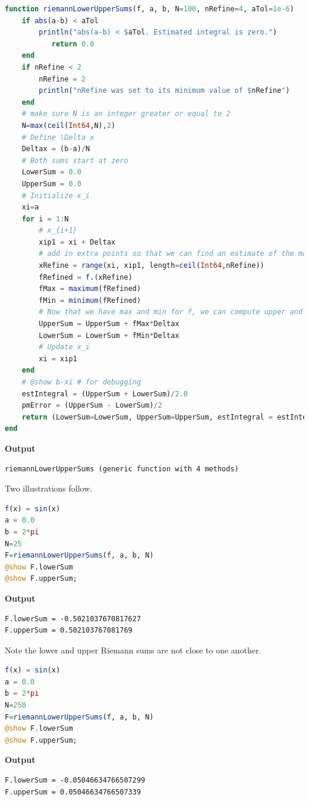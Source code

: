 \bigskip

\begin{lstlisting}[language=Julia,style=mystyle]
function riemannLowerUpperSums(f, a, b, N=100, nRefine=4, aTol=1e-6)
    if abs(a-b) < aTol 
        println("abs(a-b) < $aTol. Estimated integral is zero.")
           return 0.0
    end
    if nRefine < 2
        nRefine = 2
        println("nRefine was set to its minimum value of $nRefine")
    end
    # make sure N is an integer greater or equal to 2
    N=max(ceil(Int64,N),2)
    # Define \Delta x
    Deltax = (b-a)/N
    # Both sums start at zero
    LowerSum = 0.0
    UpperSum = 0.0
    # Initialize x_i
    xi=a 
    for i = 1:N
        # x_{i+1}
        xip1 = xi + Deltax
        # add in extra points so that we can find an estimate of the max and min
        xRefine = range(xi, xip1, length=ceil(Int64,nRefine))
        fRefined = f.(xRefine)
        fMax = maximum(fRefined)
        fMin = minimum(fRefined)
        # Now that we have max and min for f, we can compute upper and lower sums
        UpperSum = UpperSum + fMax*Deltax
        LowerSum = LowerSum + fMin*Deltax
        # Update x_i
        xi = xip1 
    end
    # @show b-xi # for debugging
    estIntegral = (UpperSum + LowerSum)/2.0
    pmError = (UpperSum - LowerSum)/2
    return (LowerSum=LowerSum, UpperSum=UpperSum, estIntegral = estIntegral, pmError = pmError)
end
\end{lstlisting}
\textbf{Output} 
\begin{verbatim}
riemannLowerUpperSums (generic function with 4 methods)
\end{verbatim}

\bigskip
Two illustrations follow.
\bigskip
\begin{lstlisting}[language=Julia,style=mystyle]
f(x) = sin(x)
a = 0.0
b = 2*pi
N=25
F=riemannLowerUpperSums(f, a, b, N)
@show F.lowerSum 
@show F.upperSum; 
\end{lstlisting}
\textbf{Output} 
\begin{verbatim}
F.lowerSum = -0.5021037670817627
F.upperSum = 0.502103767081769
\end{verbatim}

\bigskip
Note the lower and upper Riemann sums are not close to one another.
\bigskip

\begin{lstlisting}[language=Julia,style=mystyle]
f(x) = sin(x)
a = 0.0
b = 2*pi
N=250
F=riemannLowerUpperSums(f, a, b, N)
@show F.lowerSum 
@show F.upperSum; 
\end{lstlisting}
\textbf{Output} 
\begin{verbatim}
F.lowerSum = -0.05046634766507299
F.upperSum = 0.05046634766507339
\end{verbatim}

